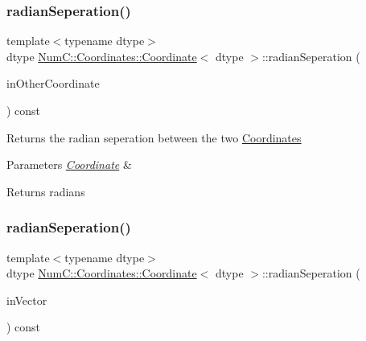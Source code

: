 \subsubsection{\texorpdfstring{radian\+Seperation()}{radianSeperation()}\hspace{0.1cm}{\footnotesize\ttfamily [1/2]}}
{\footnotesize\ttfamily template$<$typename dtype$>$ \\
dtype \mbox{\hyperlink{class_num_c_1_1_coordinates_1_1_coordinate}{Num\+C\+::\+Coordinates\+::\+Coordinate}}$<$ dtype $>$\+::radian\+Seperation (\begin{DoxyParamCaption}\item[{const \mbox{\hyperlink{class_num_c_1_1_coordinates_1_1_coordinate}{Coordinate}}$<$ dtype $>$ \&}]{in\+Other\+Coordinate }\end{DoxyParamCaption}) const\hspace{0.3cm}{\ttfamily [inline]}}

Returns the radian seperation between the two \mbox{\hyperlink{namespace_num_c_1_1_coordinates}{Coordinates}}


\begin{DoxyParams}{Parameters}
{\em \mbox{\hyperlink{class_num_c_1_1_coordinates_1_1_coordinate}{Coordinate}}} & \\
\hline
\end{DoxyParams}
\begin{DoxyReturn}{Returns}
radians 
\end{DoxyReturn}
\mbox{\label{class_num_c_1_1_coordinates_1_1_coordinate_ad2a13417b085c7bd98f64f7b47920972}} 
\subsubsection{\texorpdfstring{radian\+Seperation()}{radianSeperation()}\hspace{0.1cm}{\footnotesize\ttfamily [2/2]}}
{\footnotesize\ttfamily template$<$typename dtype$>$ \\
dtype \mbox{\hyperlink{class_num_c_1_1_coordinates_1_1_coordinate}{Num\+C\+::\+Coordinates\+::\+Coordinate}}$<$ dtype $>$\+::radian\+Seperation (\begin{DoxyParamCaption}\item[{const \mbox{\hyperlink{class_num_c_1_1_nd_array}{Nd\+Array}}$<$ dtype $>$ \&}]{in\+Vector }\end{DoxyParamCaption}) const\hspace{0.3cm}{\ttfamily [inline]}}

